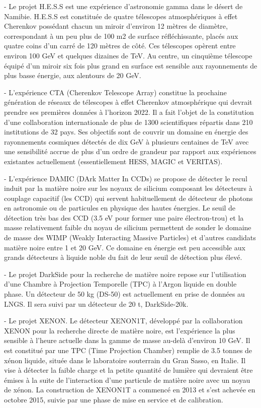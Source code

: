 \documentclass[french,a4paper,12pt]{report}
\begin{document}
\begin{itemize}
			- Le projet H.E.S.S est une expérience d'astronomie gamma dans le désert de Namibie. H.E.S.S est constituée de quatre télescopes atmosphériques à effet Cherenkov possédant chacun un miroir d’environ 12 mètres de diamètre, correspondant à un peu plus de 100 m2 de surface réfléchissante, placés aux quatre coins d’un carré de 120 mètres de côté. Ces télescopes opèrent entre environ 100 GeV et quelques dizaines de TeV. Au centre, un cinquième télescope équipé d’un miroir six fois plus grand en surface est sensible aux rayonnements de plus basse énergie, aux alentours de 20 GeV. 
			
			- L'expérience CTA (Cherenkov Telescope Array) constitue la prochaine génération de réseaux de télescopes à effet Cherenkov atmosphérique qui devrait prendre ses premières données à l’horizon 2022. Il a fait l’objet de la constitution d’une collaboration internationale de plus de 1300 scientifiques répartis dans 210 institutions de 32 pays. Ses objectifs sont de couvrir un domaine en énergie des rayonnements cosmiques détectés de dix GeV à plusieurs centaines de TeV avec une sensibilité accrue de plus d’un ordre de grandeur par rapport aux expériences existantes actuellement (essentiellement HESS, MAGIC et VERITAS).
			
			- L’expérience DAMIC (DArk Matter In CCDs) se propose de détecter le recul induit par la matière noire sur les noyaux de silicium composant les détecteurs à couplage capacitif (les CCD) qui servent habituellement de détecteur de photons en astronomie ou de particules en physique des hautes énergies. Le seuil de détection très bas des CCD (3.5 eV pour former une paire électron-trou) et la masse relativement faible du noyau de silicium permettent de sonder le domaine de masse des WIMP (Weakly Interacting Massive Particles) et d’autres candidats matière noire entre 1 et 20 GeV. Ce domaine en énergie est peu accessible aux grands détecteurs à liquide noble du fait de leur seuil de détection plus élevé.
						
			- Le projet DarkSide pour la recherche de matière noire repose sur l’utilisation d’une Chambre à Projection Temporelle (TPC) à l’Argon liquide en double phase. Un détecteur de 50 kg (DS-50) est actuellement en prise de données au LNGS. Il sera suivi par un détecteur de 20 t, DarkSide-20k.
			
			- Le projet XENON.
			Le détecteur XENON1T, développé par la collaboration XENON pour la recherche directe de matière noire, est l’expérience la plus sensible à l’heure actuelle dans la gamme de masse au-delà d’environ 10 GeV. Il est constitué par une TPC (Time Projection Chamber) remplie de 3.5 tonnes de xénon liquide, située dans le laboratoire souterrain du Gran Sasso, en Italie. Il vise à détecter la faible charge et la petite quantité de lumière qui devraient être émises à la suite de l’interaction d’une particule de matière noire avec un noyau de xénon. La construction de XENON1T a commencé en 2013 et s’est achevée en octobre 2015, suivie par une phase de mise en service et de calibration.
			

\end{itemize}
\end{document}
